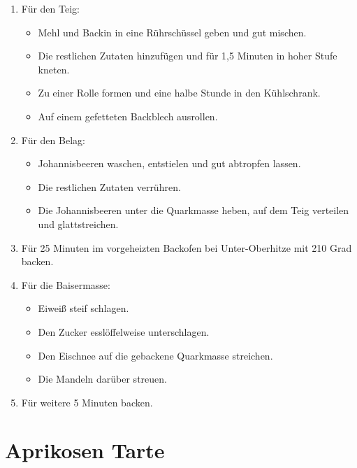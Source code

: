 \begin{enumerate}
    \item Für den Teig:
    \begin{itemize}
        \item Mehl und Backin in eine Rührschüssel geben und gut mischen.
        \item Die restlichen Zutaten hinzufügen und für 1,5 Minuten in hoher Stufe kneten.
        \item Zu einer Rolle formen und eine halbe Stunde in den Kühlschrank.
        \item Auf einem gefetteten Backblech ausrollen.
    \end{itemize}
    \item Für den Belag:
    \begin{itemize}
        \item Johannisbeeren waschen, entstielen und gut abtropfen lassen. 
        \item Die restlichen Zutaten verrühren.
        \item Die Johannisbeeren unter die Quarkmasse heben, auf dem Teig verteilen und glattstreichen.
    \end{itemize}
    \item Für 25 Minuten im vorgeheizten Backofen bei Unter-Oberhitze mit 210 Grad backen. 
    \item Für die Baisermasse:
    \begin{itemize}
        \item Eiweiß steif schlagen.
        \item Den Zucker esslöffelweise unterschlagen.
        \item Den Eischnee auf die gebackene Quarkmasse streichen.
        \item Die Mandeln darüber streuen.
    \end{itemize}
    \item Für weitere 5 Minuten backen.
\end{enumerate}

\section{Aprikosen Tarte}  


